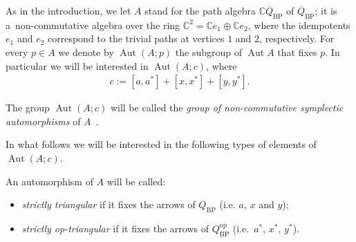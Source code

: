 \documentclass[11pt]{article}
\newcommand{\bb}[1]{\mathbb{#1}}
\newcommand{\ol}[1]{\overline{#1}}
\DeclareMathOperator{\Aut}{Aut}
\begin{document}
As in the introduction, we let \(A\) stand for the path algebra \(\bb{C}\ol{Q}_{\mathrm{BP}}\) of
\(\ol{Q}_{\mathrm{BP}}\); it is a~non-commutative algebra over the ring \(\bb{C}^{2} = \bb{C}e_{1} \oplus
\bb{C}e_{2}\), where the idempotents \(e_{1}\) and \(e_{2}\) correspond to the trivial paths at vertices
\(1\) and \(2\), respectively.
For every \(p\in A\) we denote by \(\Aut (A;p)\) the subgroup of \(\Aut A\) that f\/ixes \(p\).
In particular we will be interested in \(\Aut (A;c)\), where
\begin{gather*}
c\mathrel{:=}[a,a^{*}]+[x,x^{*}]+[y,y^{*}].
\end{gather*}

\begin{definition}
The group \(\Aut (A;c)\) will be called the \textit{group of non-commutative symplectic automorphisms} of
\(A\)~\cite{bp08, kont93}.
\end{definition}

In what follows we will be interested in the following types of elements of \(\Aut (A;c)\).
\begin{definition}
An automorphism of \(A\) will be called:
\begin{itemize}\itemsep=0pt
\item \textit{strictly triangular} if it f\/ixes the arrows of \(Q_{\mathrm{BP}}\) (i.e.
\(a\), \(x\) and \(y\));
\item \textit{strictly op-triangular} if it f\/ixes the arrows of
\(Q_{\mathrm{BP}}^{\mathrm{op}}\) (i.e.\
\(a^{*}\), \(x^{*}\), \(y^{*}\)).
\end{itemize}
\end{definition}
\end{document}
